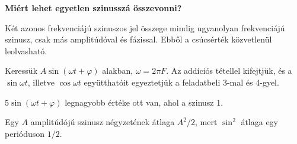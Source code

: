 \begin{elmelet}
\textbf{Miért lehet egyetlen szinusszá összevonni?}\par Két azonos frekvenciájú szinuszos jel összege mindig ugyanolyan frekvenciájú szinusz, csak más amplitúdóval és fázissal. Ebből a csúcsérték közvetlenül leolvasható.
\end{elmelet}

Keressük $A\sin(\omega t+\varphi)$ alakban, $\omega=2\pi F$. Az addíciós tétellel kifejtjük, és a $\sin\omega t$, illetve $\cos\omega t$ együtthatóit egyeztetjük a feladatbeli 3-mal és 4-gyel.

\begin{center}\end{center}

\begin{center}\end{center}

\begin{center}\end{center}

\begin{center}\end{center}

$5\sin(\omega t+\varphi)$ legnagyobb értéke ott van, ahol a szinusz 1.

\begin{center}\end{center}

Egy $A$ amplitúdójú szinusz négyzetének átlaga $A^2/2$, mert $\sin^2$ átlaga egy perióduson $1/2$.

\begin{center}\end{center}


